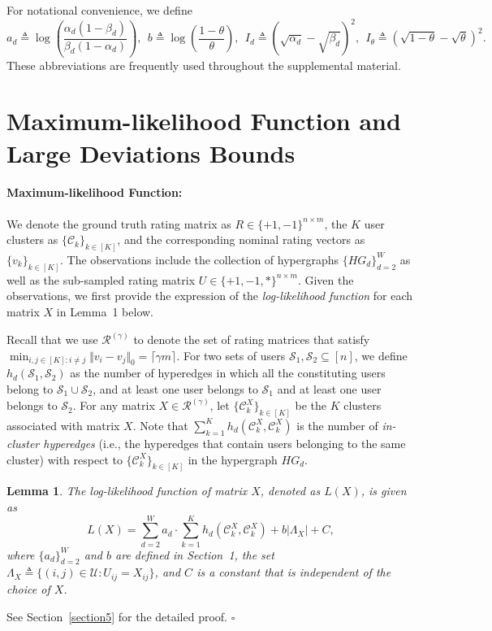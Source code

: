 \documentclass{article}
\newtheorem{lemma}{Lemma}
\newcommand\ad{\log \left( \frac{\alpha_d (1-\beta_d)}{\beta_d (1-\alpha_d)} \right)}
\newcommand\bb{\log \left( \frac{1-\theta}{\theta} \right)}
\newenvironment{proof}{{\noindent\it Proof:}\quad}{\hfill $\square$\par}
\begin{document}
For notational convenience, we define $$a_d \triangleq \ad, \ \ b \triangleq \bb, \ \ I_d \triangleq (\sqrt{\alpha_d} - \sqrt{\beta_d})^2, \ \ I_{\theta} \triangleq (\sqrt{1-\theta} - \sqrt{\theta})^2.$$ 
These abbreviations are frequently used throughout the supplemental material.

\section{Maximum-likelihood Function and Large Deviations Bounds}\label{section2}
\paragraph{Maximum-likelihood Function:} We denote the ground truth rating matrix as $R \in \{+1,-1\}^{n \times m}$, the $K$ user clusters  as 
$\{ \mathcal{C}_k \}_{k \in [K]}$, and the corresponding nominal rating vectors as $\{ v_k \}_{k \in [K]}$. The observations include the collection of hypergraphs $\{HG_d \}_{d=2}^W$ as well as the sub-sampled rating matrix $U \in \{+1,-1, *\}^{n \times m}$. Given the observations, we first provide the expression of the \emph{log-likelihood function} for each matrix $X$ in Lemma~1 below. 

Recall that we use $\mathcal{R}^{(\gamma)}$ to denote the set of rating matrices that satisfy $\min_{i,j\in[K]: i \ne j} \Vert v_i - v_j\Vert_0 = \lceil \gamma m \rceil$.  For two sets of users $\mathcal{S}_1,\mathcal{S}_2 \subseteq [n]$, we define $h_d(\mathcal{S}_1, \mathcal{S}_2)$ as the number of hyperedges in which all the constituting users belong to $\mathcal{S}_1 \cup \mathcal{S}_2$, and at least one user belongs to $\mathcal{S}_1$ and at least  one user belongs to  $\mathcal{S}_2$.  %
For any matrix $X \in \mathcal{R}^{(\gamma)}$, let $\{\mathcal{C}_k^X\}_{k \in [K]}$ be the $K$ clusters associated with matrix $X$. Note that $\sum_{k=1}^K h_d( \mathcal{C}^X_k,  \mathcal{C}^X_k)$ is the number of \emph{in-cluster hyperedges} (i.e., the hyperedges that contain users belonging to the same cluster) with respect to $\{\mathcal{C}_k^X\}_{k \in [K]}$  in the hypergraph $HG_d$.
\begin{lemma}\label{lemma1}
    The log-likelihood function of matrix $X$, denoted as $L(X)$, is given as
    \begin{equation}
        L(X) = \sum_{d=2}^{W} a_d \cdot \sum_{k=1}^K h_d( \mathcal{C}^X_k,  \mathcal{C}^X_k) + b |\Lambda_X| + C,
    \end{equation}
    where $\{a_d\}_{d=2}^W$ and $b$ are defined in Section~1, the set $\Lambda_X\triangleq \{ (i, j) \in \mathcal{U} :  U_{ij}=X_{ij} \}$, and $C$ is a constant that is independent of the choice of $X$.
\end{lemma}
\begin{proof}
    See Section~\ref{section5} for the detailed proof.
\end{proof}
\end{document}
